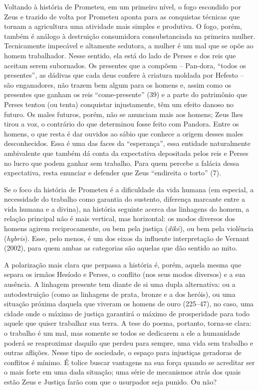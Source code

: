 Voltando à história de Prometeu, em um primeiro nível, o fogo
escondido por Zeus e trazido de volta por Prometeu aponta para as
conquistas técnicas que tornam a agricultura uma atividade mais simples
e produtiva. O fogo, porém, também é análogo à destruição consumidora
consubstanciada na primeira mulher. Tecnicamente impecável e altamente
sedutora, a mulher é um mal que se opõe ao homem trabalhador. Nesse
sentido, ela está do lado de Perses e dos reis que aceitam serem
subornados. Os presentes que a compõem – Pan-dora, “todos os presentes”,
as dádivas que cada deus confere à criatura moldada por Hefesto – são
enganadores, não trazem bem algum para os homens e, assim como os
presentes que ganham os reis “come-presente” (39) e a parte do
patrimônio que Perses tentou (ou tenta) conquistar injustamente, têm
um efeito danoso no futuro. Os males futuros, porém, não se anunciam
mais aos homens; Zeus lhes tirou a voz, o contrário do que determinou
fosse feito com Pandora. Entre os homens, o que resta é dar ouvidos ao
sábio que conhece a origem desses males desconhecidos. Essa é uma das
faces da “esperança”, essa entidade naturalmente ambivalente que também
dá conta da expectativa depositada pelos reis e Perses no lucro que
podem ganhar sem trabalho. Para quem percebe a falácia dessa
expectativa, resta enunciar e defender que Zeus “endireita o torto”
(7).

Se o foco da história de Prometeu é a dificuldade da vida humana (em especial, 
a necessidade do trabalho como garantia do sustento, diferença marcante entre 
a vida humana e a divina), na história seguinte acerca das linhagens do homem, 
a relação principal não é mais vertical, mas horizontal: os modos diversos dos 
homens agirem reciprocamente, ou bem pela justiça (\textit{dik\=e}), ou bem 
pela violência (\textit{hybris}). Esse, pelo menos, é um dos eixos da
influente interpretação de Vernant (2002), para quem ambas as categorias são 
aquelas que dão sentido ao mito.

A polarização mais clara que perpassa a história é, porém, aquela
mesma que separa os irmãos Hesíodo e Perses, o conflito (nos seus modos
diversos) e a sua ausência. A linhagem presente tem diante de si uma
dupla alternativa: ou a autodestruição (como as linhagens de prata, bronze
e a dos heróis), ou uma situação próxima daquela que viveram
os homens de ouro (225--47), no caso, uma cidade onde o máximo de
justiça garantirá o máximo de prosperidade para todo aquele que quiser
trabalhar sua terra. A tese do poema, portanto, torna-se clara: o
trabalho é um mal, mas somente se todos se dedicarem a ele a
humanidade poderá se reaproximar daquilo que perdeu para sempre, uma
vida sem trabalho e outras aflições. Nesse tipo de sociedade, o espaço
para injustiças geradoras de conflitos é mínimo. É tolice buscar vantagens 
na sua força quando se acreditar ser o mais forte em uma dada situação; 
uma série de mecanismos atrás dos quais estão Zeus e Justiça
farão com que o usurpador seja punido. Ou não?

